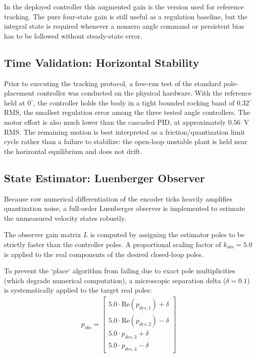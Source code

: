 \documentclass[11pt,a4paper]{article}
\begin{document}
In the deployed controller this augmented gain is the version used for reference tracking. The pure four-state gain is still useful as a regulation baseline, but the integral state is required whenever a nonzero angle command or persistent bias has to be followed without steady-state error.

\subsection{Time Validation: Horizontal Stability}
Prior to executing the tracking protocol, a free-run test of the standard pole-placement controller was conducted on the physical hardware. With the reference held at $0^\circ$, the controller holds the body in a tight bounded rocking band of $0.32^\circ$ RMS, the smallest regulation error among the three tested angle controllers. The motor effort is also much lower than the cascaded PID, at approximately $0.56$~V RMS. The remaining motion is best interpreted as a friction/quantization limit cycle rather than a failure to stabilize: the open-loop unstable plant is held near the horizontal equilibrium and does not drift.

\subsection{State Estimator: Luenberger Observer}
Because raw numerical differentiation of the encoder ticks heavily amplifies quantization noise, a full-order Luenberger observer is implemented to estimate the unmeasured velocity states robustly.

The observer gain matrix $L$ is computed by assigning the estimator poles to be strictly faster than the controller poles. A proportional scaling factor of $k_{obs} = 5.0$ is applied to the real components of the desired closed-loop poles. 

To prevent the `place` algorithm from failing due to exact pole multiplicities (which degrade numerical computation), a microscopic separation delta ($\delta = 0.1$) is systematically applied to the target real poles:
\begin{equation}
\begin{aligned}
    p_{obs} = \begin{bmatrix}
        5.0 \cdot \text{Re}(p_{des, 1}) + \delta \\
        5.0 \cdot \text{Re}(p_{des, 2}) - \delta \\
        5.0 \cdot p_{des, 3} + \delta \\
        5.0 \cdot p_{des, 4} - \delta 
    \end{bmatrix}
\end{aligned}
\end{equation}
\end{document}
